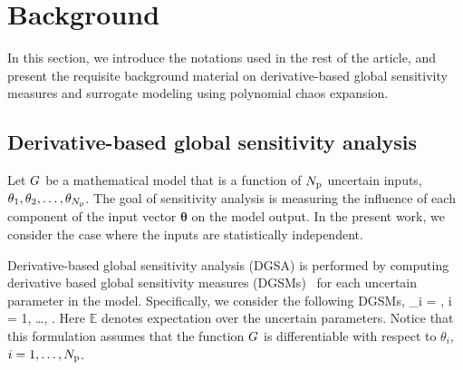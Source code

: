 \section{Background}
\label{sec:bg}

In this section, we introduce the notations used in the rest of
the article, and present the requisite background material on 
derivative-based global sensitivity measures and surrogate modeling 
using polynomial chaos expansion.

\subsection{Derivative-based global sensitivity analysis}  
\label{sub:dgsm}

Let $G$ be a mathematical model that is a function of ${N_\text{p}}$ uncertain 
inputs, $\theta_1, \theta_2, \ldots, \theta_{N_\text{p}}$. The goal of sensitivity analysis
is measuring the influence of each component of the input vector 
$\bm{\theta}$ on the model output. 
In the present work, we consider the case where the inputs are statistically 
independent. 

Derivative-based global sensitivity analysis (DGSA) is performed by 
computing derivative based global sensitivity measures (DGSMs)~\cite{Sobol:2009} 
for each uncertain parameter in the model. 
Specifically, we consider the following DGSMs, 
\be
\mu_i = 
, \quad i = 1, \ldots, \Np.
\label{eq:mu}
\ee
Here $\mathbb{E}$ denotes expectation over the uncertain parameters.
Notice that this formulation assumes that the function $G$ is differentiable
with respect to $\theta_i$, $i = 1, \ldots, {N_\text{p}}$.

